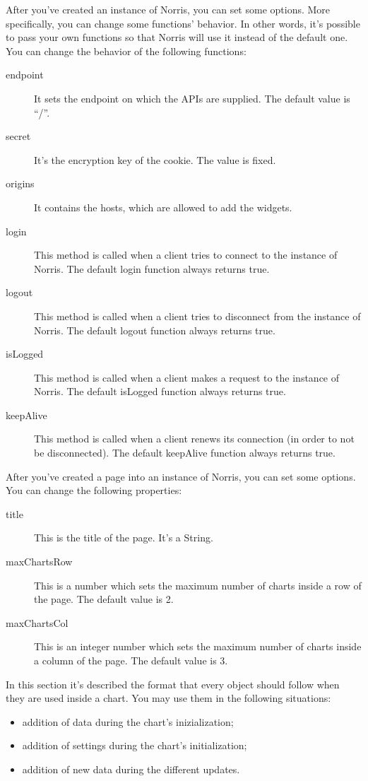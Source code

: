  \label{sec:ObjectsDescription}
	 \label{sec:ObjectsDescriptionNorris}
		After you've created an instance of Norris, you can set some options. More specifically, you can change some functions' behavior. In other words, it's possible to pass your own functions so that Norris will use it instead of the default one.\\
		You can change the behavior of the following functions:
		\begin{description}
			\item[endpoint] It sets the endpoint on which the APIs are supplied. The default value is “/”.
			\item[secret] It's the encryption key of the cookie. The value is fixed.
			\item[origins] It contains the hosts, which are allowed to add the widgets.
			\item[login] This method is called when a client tries to connect to the instance of Norris. The default login function always returns true.
			\item[logout] This method is called when a client tries to disconnect from the instance of Norris. The default logout function always returns true.
			\item[isLogged] This method is called when a client makes a request to the instance of Norris. The default isLogged function always returns true.
			\item[keepAlive] This method is called when a client renews its connection (in order to not be disconnected). The default keepAlive function always returns true.
		\end{description}
		After you've created a page into an instance of Norris, you can set some options. You can change the following properties:
		\begin{description}
			\item[title] This is the title of the page. It's a String.
			\item[maxChartsRow] This is a number which sets the maximum number of charts inside a row of the page. The default value is 2.
			\item[maxChartsCol] This is an integer number which sets the maximum number of charts inside a column of the page. The default value is 3.
		\end{description}
	 \label{sec:ObjectsDescriptionCharts}
		In this section it's described the format that every  object should follow when they are used inside a chart. You may use them in the following situations:
		\begin{itemize}
			\item addition of data during the chart's inizialization;
			\item addition of settings during the chart's initialization;
			\item addition of new data during the different updates.
		\end{itemize}

